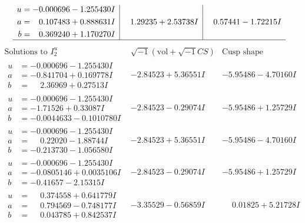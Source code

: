 \documentclass[1p]{elsarticle_modified}
\theoremstyle{definition}
\newcommand{\I}{\sqrt{-1}}
\begin{document}
$$\begin{array}{c|c|c}
\begin{aligned}
u &= -0.000696 - 1.255430 I \\
a &= \phantom{-}0.107483 + 0.888631 I \\
b &= \phantom{-}0.369240 + 1.170270 I\end{aligned}
 & \phantom{-}1.29235 + 2.53738 I & \phantom{-}0.57441 - 1.72215 I\\
 \hline 
 \end{array}$$\newpage$$\begin{array}{c|c|c}  
\text{Solutions to }I^u_{2}& \I (\text{vol} + \sqrt{-1}CS) & \text{Cusp shape}\\
 \hline 
\begin{aligned}
u &= -0.000696 - 1.255430 I \\
a &= -0.841704 + 0.169778 I \\
b &= \phantom{-}2.36969 + 0.27513 I\end{aligned}
 & -2.84523 + 5.36551 I & -5.95486 - 4.70160 I \\ \hline\begin{aligned}
u &= -0.000696 - 1.255430 I \\
a &= -1.71526 + 0.33087 I \\
b &= -0.0044633 - 0.1010780 I\end{aligned}
 & -2.84523 - 0.29074 I & -5.95486 + 1.25729 I \\ \hline\begin{aligned}
u &= -0.000696 - 1.255430 I \\
a &= \phantom{-}0.22020 - 1.88744 I \\
b &= -0.213730 - 1.056580 I\end{aligned}
 & -2.84523 + 5.36551 I & -5.95486 - 4.70160 I \\ \hline\begin{aligned}
u &= -0.000696 - 1.255430 I \\
a &= -0.0805146 + 0.0035106 I \\
b &= -0.41657 - 2.15315 I\end{aligned}
 & -2.84523 - 0.29074 I & -5.95486 + 1.25729 I \\ \hline\begin{aligned}
u &= \phantom{-}0.374558 + 0.641779 I \\
a &= \phantom{-}0.794569 - 0.748177 I \\
b &= \phantom{-}0.043785 + 0.842537 I\end{aligned}
 & -3.35529 - 0.56859 I & \phantom{-}0.01825 + 5.21728 I \\ \hline\begin{aligned}

\end{aligned}
\end{array}$$
\end{document}
